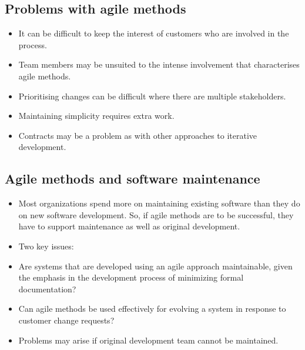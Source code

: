  \subsection{ Problems with agile methods}
 \begin{itemize}


\item It can be difficult to keep the interest of customers who are involved in the process.

\item Team members may be unsuited to the intense involvement that characterises agile methods.

\item Prioritising changes can be difficult where there are multiple stakeholders.

\item Maintaining simplicity requires extra work.

\item Contracts may be a problem as with other approaches to iterative development.

\end{itemize}
\subsection{ Agile methods and software maintenance}
\begin{itemize}

\item Most organizations spend more on maintaining existing software than they do on new software development. So, if agile methods are to be successful, they have to support maintenance as well as original development.

\item Two key issues:

\item Are systems that are developed using an agile approach maintainable, given the emphasis in the development process of minimizing formal documentation?
\item Can agile methods be used effectively for evolving a system in response to customer change requests?

\item Problems may arise if original development team cannot be maintained.


\end{itemize}
